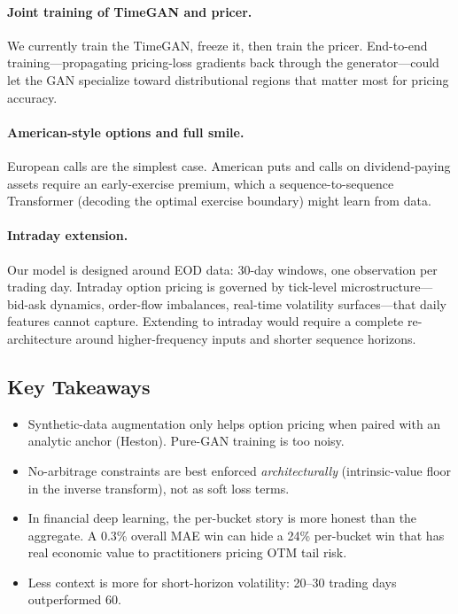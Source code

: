\documentclass[conference]{IEEEtran}
\begin{document}
\paragraph*{Joint training of TimeGAN and pricer.}
We currently train the TimeGAN, freeze it, then train the
pricer. End-to-end training---propagating pricing-loss
gradients back through the generator---could let the GAN
specialize toward distributional regions that matter most for
pricing accuracy.

\paragraph*{American-style options and full smile.}
European calls are the simplest case. American puts and calls
on dividend-paying assets require an early-exercise premium,
which a sequence-to-sequence Transformer (decoding the
optimal exercise boundary) might learn from data.

\paragraph*{Intraday extension.}
Our model is designed around EOD data: 30-day windows, one
observation per trading day. Intraday option pricing is
governed by tick-level microstructure---bid-ask dynamics,
order-flow imbalances, real-time volatility surfaces---that
daily features cannot capture. Extending to intraday would
require a complete re-architecture around higher-frequency
inputs and shorter sequence horizons.

\subsection{Key Takeaways}

\begin{itemize}
\item Synthetic-data augmentation only helps option pricing
when paired with an analytic anchor (Heston). Pure-GAN
training is too noisy.
\item No-arbitrage constraints are best enforced
\emph{architecturally} (intrinsic-value floor in the inverse
transform), not as soft loss terms.
\item In financial deep learning, the per-bucket story is
more honest than the aggregate. A 0.3\% overall MAE win can
hide a 24\% per-bucket win that has real economic value to
practitioners pricing OTM tail risk.
\item Less context is more for short-horizon volatility:
20--30 trading days outperformed 60.
\end{itemize}
\end{document}
